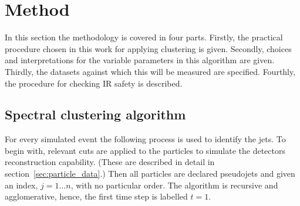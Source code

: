 \section{Method}
In this section the methodology is covered in four parts.
Firstly, the practical procedure chosen in this work for applying \spectral{} clustering  is given.
Secondly, choices and interpretations for the variable parameters in this algorithm are given.
Thirdly,  the datasets against which this will be measured are specified.
Fourthly, the procedure for checking IR safety is described.


\subsection{Spectral clustering algorithm}\label{sec:spectralmethodalgo}
    For every simulated event the following process is used to identify the jets.
%
    To begin with, relevant cuts are applied to the particles to simulate the detectors reconstruction capability.
    (These are described in detail in section~\ref{sec:particle_data}.)
    Then all particles are declared pseudojets  and given an index, \(j = 1 \dots n\), with no particular order.
    The algorithm is recursive and agglomerative, hence, the first time 
     step is labelled \(t=1\).

